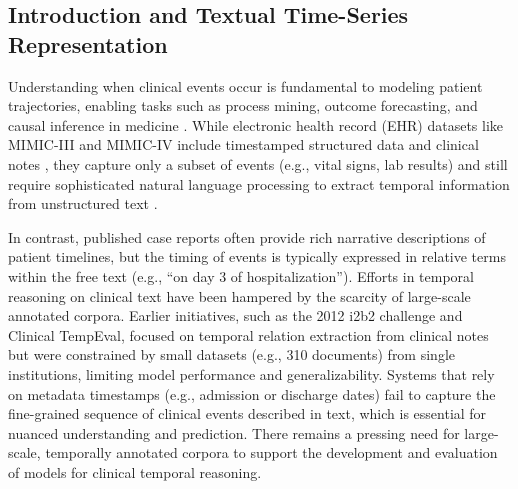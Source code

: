 \subsection{Introduction and Textual Time-Series Representation}
\label{ch05:sec:introduction}

Understanding when clinical events occur is fundamental to modeling patient trajectories, enabling tasks such as process mining, outcome forecasting, and causal inference in medicine \citep{jensen2012mining,noren2010temporal,noroozizadeh2025forecasting}.
While electronic health record (EHR) datasets like MIMIC-III and MIMIC-IV include timestamped structured data and clinical notes \citep{johnson2016mimic,ch05:johnson2023mimic}, they capture only a subset of events (e.g., vital signs, lab results) and still require sophisticated natural language processing to extract temporal information from unstructured text \citep{viani2021temporal,cheng2023typed}.


In contrast, published case reports often provide rich narrative descriptions of patient timelines, but the timing of events is typically expressed in relative terms within the free text (e.g., “on day 3 of hospitalization”).
Efforts in temporal reasoning on clinical text have been hampered by the scarcity of large-scale annotated corpora.
Earlier initiatives, such as the 2012 i2b2 challenge and Clinical TempEval, focused on temporal relation extraction from clinical notes \citep{sun2013evaluating,bethard2016semeval,galvan2018investigating} but were constrained by small datasets (e.g., 310 documents) from single institutions, limiting model performance and generalizability.
Systems that rely on metadata timestamps (e.g., admission or discharge dates) fail to capture the fine-grained sequence of clinical events described in text, which is essential for nuanced understanding and prediction.
There remains a pressing need for large-scale, temporally annotated corpora to support the development and evaluation of models for clinical temporal reasoning.



